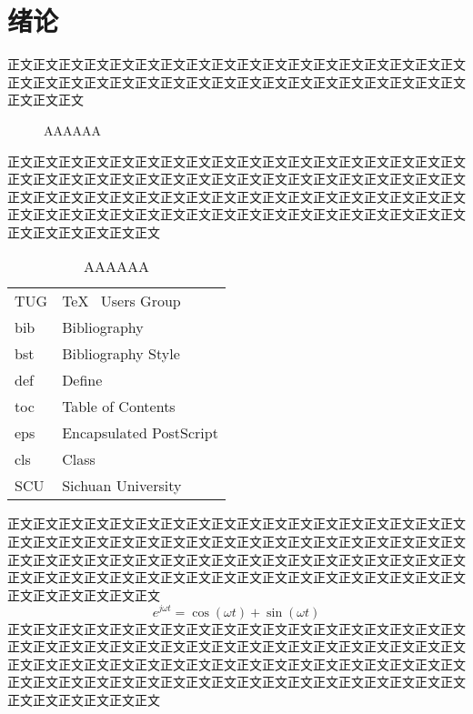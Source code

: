 \chapter{绪论}
正文正文正文正文正文正文正文正文正文正文正文正文正文正文正文正文正文正文正文正文正文正文正文正文正文正文正文正文正文正文正文正文正文正文正文正文正文正文正文\cite{ctex-doc,ctexfaq,solvethis}
\begin{figure}[ht]
	\centering
	\caption{AAAAAA}
	\label{fig_AAAAAA}
\end{figure}
正文正文正文正文正文正文正文正文正文正文正文正文正文正文正文正文正文正文正文正文正文正文正文正文正文正文正文正文正文正文正文正文正文正文正文正文正文正文正文正文正文正文正文正文正文正文正文正文正文正文正文正文正文正文正文正文正文正文正文正文正文正文正文正文正文正文正文正文正文正文正文正文正文正文正文正文正文正文
\begin{table}[ht]
	\centering
	\caption{AAAAAA}
	\label{tab_1111111}
	\begin{tabular}{p{7em}p{25em}}
		TUG & \TeX~ Users Group       \\
		bib & Bibliography            \\
		bst & Bibliography Style      \\
		def & Define                  \\
		toc & Table of Contents       \\
		eps & Encapsulated PostScript \\
		cls & Class                   \\
		SCU & Sichuan University
	\end{tabular}
\end{table}
正文正文正文正文正文正文正文正文正文正文正文正文正文正文正文正文正文正文正文正文正文正文正文正文正文正文正文正文正文正文正文正文正文正文正文正文正文正文正文正文正文正文正文正文正文正文正文正文正文正文正文正文正文正文正文正文正文正文正文正文正文正文正文正文正文正文正文正文正文正文正文正文正文正文正文正文正文正文
\begin{equation}
	e^{j\omega t}=\cos(\omega t)+\sin(\omega t)
	\label{eqn_ourla}
\end{equation}
正文正文正文正文正文正文正文正文正文正文正文正文正文正文正文正文正文正文正文正文正文正文正文正文正文正文正文正文正文正文正文正文正文正文正文正文正文正文正文正文正文正文正文正文正文正文正文正文正文正文正文正文正文正文正文正文正文正文正文正文正文正文正文正文正文正文正文正文正文正文正文正文正文正文正文正文正文正文
